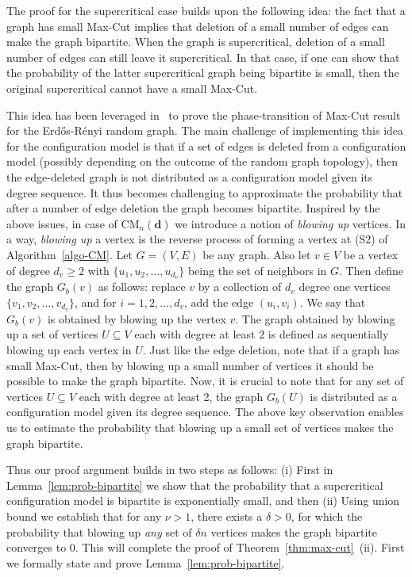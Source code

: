 \documentclass[11pt,a4paper, reqno]{article}
\numberwithin{equation}{section}
\numberwithin{equation}{section}
\newcommand{\1}{\ensuremath{\mathbbm{1}}}
\newcommand{\CM}{\ensuremath{\mathrm{CM}_n(\boldsymbol{d})}}
\numberwithin{equation}{section}
\numberwithin{theorem}{section}
\begin{document}
The proof for the supercritical case builds upon the following idea: 
the fact that a graph has small Max-Cut implies that deletion of a small number of edges can make the graph bipartite.
When the graph is supercritical, deletion of a small number of edges can still leave it supercritical.
In that case, if one can show that the  probability of the latter supercritical graph being bipartite is small, then  the original supercritical cannot have a small Max-Cut.

This idea has been leveraged in~\cite[Theorem 21]{CGHS04} to prove the phase-transition of Max-Cut result for the Erd\H{o}s-R\'enyi random graph.
The main challenge of implementing this idea for the configuration model is that if a set of edges is deleted from a configuration model (possibly depending on the outcome of the random graph topology), then the edge-deleted graph is not distributed as a configuration model given its degree sequence.
It thus becomes challenging to approximate the probability that after a number of edge deletion the graph becomes bipartite.
Inspired by the above issues, in case of $\CM$ we introduce a notion of \emph{blowing up} vertices.
In a way, \emph{blowing up} a vertex is the reverse process of forming a vertex at (S2) of Algorithm~\ref{algo-CM}.
Let $G=(V,E)$ be any graph. 
Also let $v\in V$ be a vertex of degree $d_v\geq 2$ with $\{u_1,u_2,\ldots,u_{d_v}\}$ being the set of neighbors in $G$.
Then define the graph $G_{b}(v)$ as follows: replace $v$ by a collection of $d_v$ degree one vertices $\{v_1,v_2,\ldots,v_{d_v}\}$, and for $i=1,2,\ldots,d_v$, add the edge $(u_i,v_i)$.
We say that $G_b(v)$ is obtained by blowing up the vertex $v$.
The graph obtained by blowing up a set of vertices $U\subseteq V$ each with degree at least 2 is defined as sequentially blowing up each vertex in $U$.
Just like the edge deletion, note that if a graph has small Max-Cut, then by blowing up a small number of vertices it should be possible to make the graph bipartite.
Now, it is crucial to note that for any set of vertices $U\subseteq V$ each with degree at least 2, the graph $G_b(U)$ is distributed as a configuration model given its degree sequence.
The above key observation enables us to estimate the probability that blowing up a small set of vertices makes the graph bipartite.


Thus our proof argument builds in two steps as follows: 
(i) First in Lemma~\ref{lem:prob-bipartite} we show that the probability that a supercritical configuration model is bipartite is exponentially small, and then 
(ii) Using union bound we establish that for any $\nu>1$, there exists a $\delta>0$, for which the probability that blowing up \emph{any} set of $\delta n$ vertices makes the graph bipartite converges to 0. 
This will complete the proof of  Theorem~\ref{thm:max-cut}~(ii).
First we formally state and prove Lemma~\ref{lem:prob-bipartite}.
\end{document}
